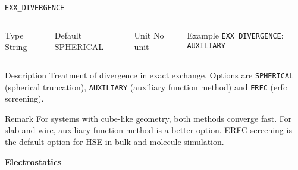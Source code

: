 \documentclass[xcolor=dvipsnames,t]{beamer}
\begin{document}
\begin{frame}[allowframebreaks]{\texttt{EXX\_DIVERGENCE}} \label{EXX_DIVERGENCE}
\vspace*{-12pt}
\begin{columns}
\begin{block}{Type}
String
\end{block}

\begin{block}{Default}
SPHERICAL
\end{block}

\begin{block}{Unit}
No unit
\end{block}

\begin{block}{Example}
\texttt{EXX\_DIVERGENCE}: \texttt{AUXILIARY}
\end{block}
\end{columns}

\begin{block}{Description}
Treatment of divergence in exact exchange. Options are \texttt{SPHERICAL} (spherical truncation), 
\texttt{AUXILIARY} (auxiliary function method) and \texttt{ERFC} (erfc screening).
\end{block}

\begin{block}{Remark}
For systems with cube-like geometry, both methods converge fast. For slab and wire, auxiliary function method is a better option. 
ERFC screening is the default option for HSE in bulk and molecule simulation.
\end{block}

\end{frame}


\begin{frame}[allowframebreaks,c]{} \label{Electrostatics}

\begin{center}
\Huge \textbf{Electrostatics}
\end{center}

\end{frame}
\end{document}
